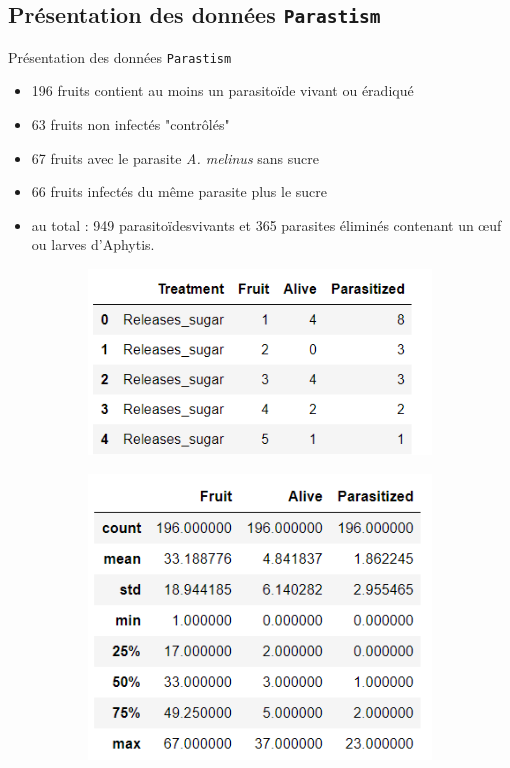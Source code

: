 \documentclass[aspectratio=1610]{beamer}
\begin{document}
\subsection{Présentation des données \texttt{Parastism}}
\begin{frame}{Présentation des données \texttt{Parastism}}
\begin{itemize}
    \item 196 fruits contient au moins un parasitoïde vivant ou éradiqué
    \item 63 fruits non infectés "contrôlés"
    \item 67 fruits avec le parasite \textit{A. melinus} sans sucre
    \item 66 fruits infectés du même parasite plus le sucre
    \item au total : 949 parasitoïdesvivants et 365 parasites éliminés contenant un œuf ou larves d’Aphytis.
    
\end{itemize}

\begin{figure}[!h]
    \centering
    \begin{subfigure}[b]{0.5\textwidth}
        \includegraphics[width=\textwidth]{datahead.png}
    \end{subfigure}
    \begin{subfigure}[b]{0.4\textwidth}
        \includegraphics[width=\textwidth]{datadescribe.png}
    \end{subfigure}
    

\end{figure}
\end{frame}
\end{document}
